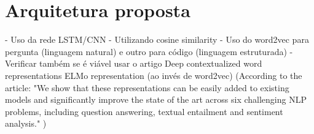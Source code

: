 \section{Arquitetura proposta} 

- Uso da rede LSTM/CNN 
       - Utilizando cosine similarity
       - Uso do word2vec para pergunta (linguagem natural) e outro para código (linguagem estruturada) - Verificar também se é viável usar o artigo Deep contextualized word representations ELMo representation (ao invés de word2vec) (According to the article: "We show that
these representations can be easily added to
existing models and significantly improve the
state of the art across six challenging NLP
problems, including question answering, textual entailment and sentiment analysis." )





